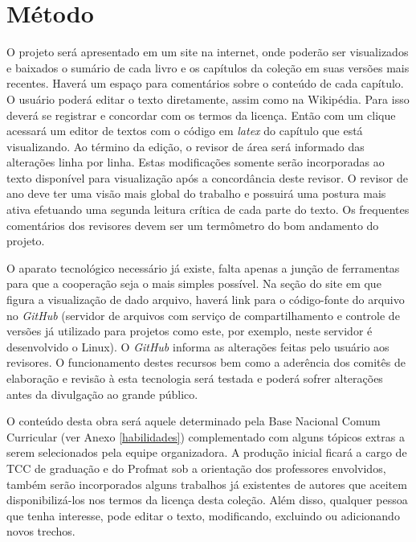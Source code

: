 \documentclass[10 pt]{article}
\begin{document}
\section{Método}
\label{metodo}

O projeto será apresentado em um site na internet, onde poderão ser visualizados e baixados o sumário de cada livro e os capítulos da coleção em suas versões mais recentes.
Haverá um espaço para comentários sobre o conteúdo de cada capítulo.
O usuário poderá editar o texto diretamente, assim como na Wikipédia.
Para isso deverá se registrar e concordar com os termos da licença.
Então com um clique acessará um editor de textos com o código em {\it latex} do capítulo que está visualizando.
Ao término da edição, o revisor de área será informado das alterações linha por linha.
Estas modificações somente serão incorporadas ao texto disponível para visualização após a concordância deste revisor.
O revisor de ano deve ter uma visão mais global do trabalho e possuirá uma postura mais ativa efetuando uma segunda leitura crítica de cada parte do texto. Os frequentes comentários dos revisores devem ser um termômetro do bom andamento do projeto.

O aparato tecnológico necessário já existe, falta apenas a junção de ferramentas para que a cooperação seja o mais simples possível.
Na seção do site em que figura a visualização de dado arquivo, haverá link para o código-fonte do arquivo no {\it GitHub} (servidor de arquivos com serviço de compartilhamento e controle de versões já utilizado para projetos como este, por exemplo, neste servidor é desenvolvido o Linux).
O {\it GitHub} informa as alterações feitas pelo usuário aos revisores.
O funcionamento destes recursos bem como a aderência dos comitês de elaboração e revisão à esta tecnologia será testada e poderá sofrer alterações antes da divulgação ao grande público.

O conteúdo desta obra será aquele determinado pela Base Nacional Comum Curricular (ver Anexo \ref{habilidades}) complementado com alguns tópicos extras a serem selecionados pela equipe organizadora.
A produção inicial ficará a cargo de TCC de graduação e do Profmat sob a orientação dos professores envolvidos, também serão incorporados alguns trabalhos já existentes de autores que aceitem disponibilizá-los nos termos da licença desta coleção.
Além disso, qualquer pessoa que tenha interesse, pode editar o texto, modificando, excluindo ou adicionando novos trechos.
\end{document}
